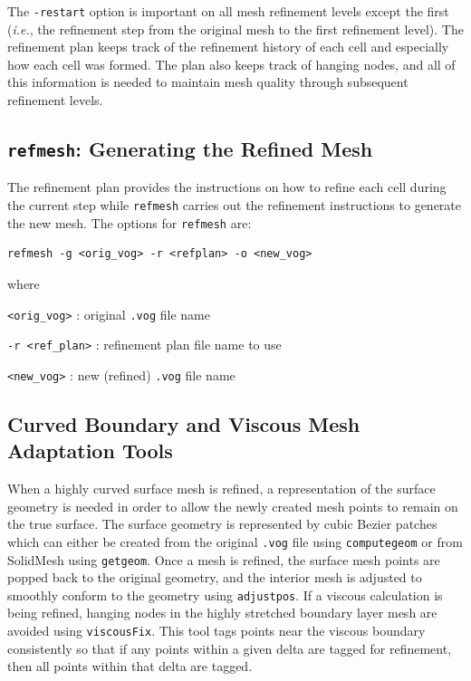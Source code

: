 The \verb!-restart! option is important on all mesh refinement levels
except the first ({\it{i.e.}}, the refinement step from the original
mesh to the first refinement level).  The refinement plan keeps track
of the refinement history of each cell and especially how each cell
was formed.  The plan also keeps track of hanging nodes, and all of
this information is needed to maintain mesh quality through subsequent
refinement levels.


\subsection{{\tt refmesh}: Generating the Refined Mesh}

The refinement plan provides the instructions on how to refine each
cell during the current step while \verb!refmesh! carries out the
refinement instructions to generate the new mesh.  The options for
\verb!refmesh! are:

\begin{verbatim}
refmesh -g <orig_vog> -r <refplan> -o <new_vog>
\end{verbatim}

\noindent
where

\begin{description}
\item {\tt <orig\_vog>} :  original \verb!.vog! file name
\item {\tt -r <ref\_plan>} :  refinement plan file name to use
\item {\tt <new\_vog>} :  new (refined) \verb!.vog! file name
\end{description}

\subsection{Curved Boundary and Viscous Mesh Adaptation Tools}

When a highly curved surface mesh is refined, a representation of the
surface geometry is needed in order to allow the newly created mesh
points to remain on the true surface.  The surface geometry is
represented by cubic Bezier patches which can either be created from
the original \verb!.vog! file using \verb!computegeom! or from
SolidMesh using \verb!getgeom!.  Once a mesh is refined, the surface
mesh points are popped back to the original geometry, and the interior
mesh is adjusted to smoothly conform to the geometry using
\verb!adjustpos!.  If a viscous calculation is being refined, hanging
nodes in the highly stretched boundary layer mesh are avoided using
\verb!viscousFix!.  This tool tags points near the viscous boundary
consistently so that if any points within a given delta are tagged for
refinement, then all points within that delta are tagged.


